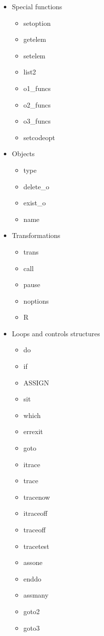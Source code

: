 \begin{itemize}
\item Special functions
\begin{itemize}
\item setoption
\item getelem
\item setelem
\item list2
\item o1\_funcs
\item o2\_funcs
\item o3\_funcs
\item setcodeopt
\end{itemize}
\item  Objects
\begin{itemize}
\item type
\item delete\_o
\item exist\_o
\item name
\end{itemize}
\item 	Transformations
\begin{itemize}
\item trans
\item call
\item pause
\item noptions
\item R
\end{itemize}
\item  Loops and controls structures
\begin{itemize}
\item do
\item if
\item ASSIGN
\item sit
\item which
\item errexit
\item goto
\item itrace
\item trace
\item tracenow
\item itraceoff
\item traceoff
\item tracetest
\item assone
\item enddo
\item assmany
\item goto2
\item goto3
\end{itemize}

\end{itemize}
